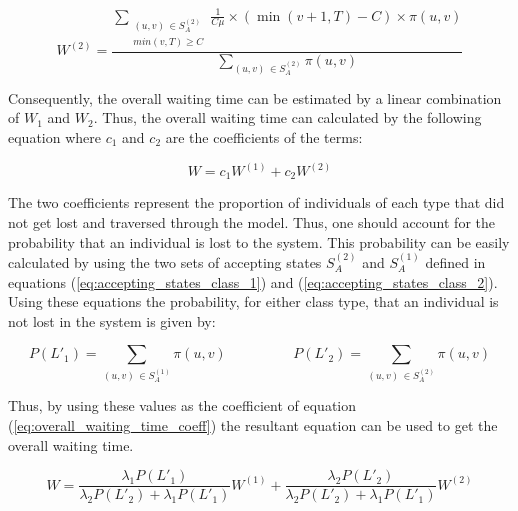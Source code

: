\begin{equation}\label{eq:closed_form_waiting_class_2}
    W^{(2)} = \frac{\sum_{\substack{(u,v) \, \in S_A^{(2)} \\ min(v,T) \geq C}} 
    \frac{1}{C \mu} \times (\min(v+1,T)-C) \times \pi(u,v)}{\sum_{(u,v) \, 
    \in S_A^{(2)}} \pi(u,v)}
\end{equation}

Consequently, the overall waiting time can be estimated by a linear combination 
of \(W_1\) and \(W_2\). 
Thus, the overall waiting time can calculated by the following equation where 
\(c_1\) and \(c_2\) are the coefficients of the terms:

\begin{equation}\label{eq:overall_waiting_time_coeff}
    W = c_1 W^{(1)} + c_2 W^{(2)}
\end{equation}

The two coefficients represent the proportion of individuals of each type that 
did not get lost and traversed through the model.
Thus, one should account for the probability that an individual is lost to the 
system. 
This probability can be easily calculated by using the two sets of accepting 
states \(S_A^{(2)}\) and \(S_A^{(1)}\) defined in equations 
(\ref{eq:accepting_states_class_1}) and (\ref{eq:accepting_states_class_2}). 
Using these equations the probability, for either class type, that an individual 
is not lost in the system is given by:

\begin{equation*}
    P(L'_1) = \sum_{(u,v) \, \in S_A^{(1)}} \pi(u,v) \hspace{2cm}
    P(L'_2) = \sum_{(u,v) \, \in S_A^{(2)}} \pi(u,v)
\end{equation*}
 
Thus, by using these values as the coefficient of equation 
(\ref{eq:overall_waiting_time_coeff}) the resultant equation can be used to get 
the overall waiting time. 

\begin{equation}\label{eq:overall_waiting_time}
    W = \frac{\lambda_1 P(L'_1)}{\lambda_2 P(L'_2) + \lambda_1 P(L'_1)} W^{(1)} + 
    \frac{\lambda_2 P(L'_2)}{\lambda_2 P(L'_2) + \lambda_1 P(L'_1)} W^{(2)}
\end{equation}
